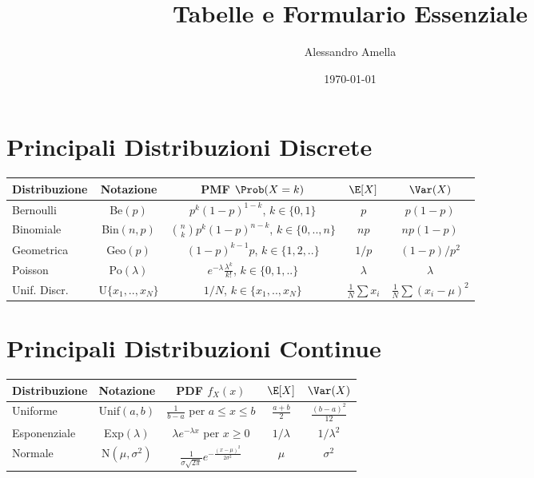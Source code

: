 

\title{Tabelle e Formulario Essenziale}
\author{Alessandro Amella}
\date{\today}



\maketitle
\tableofcontents
\newpage

\section{Principali Distribuzioni Discrete}
\begin{tabular}{|l|c|c|c|c|}
\hline
Distribuzione & Notazione & PMF $\Prob(X=k)$ & $\E[X]$ & $\Var(X)$ \\ \hline
Bernoulli & Be$(p)$ & $p^k(1-p)^{1-k}$, $k \in \{0,1\}$ & $p$ & $p(1-p)$ \\ \hline
Binomiale & Bin$(n,p)$ & $\binom{n}{k}p^k(1-p)^{n-k}$, $k \in \{0,..,n\}$ & $np$ & $np(1-p)$ \\ \hline
Geometrica & Geo$(p)$ & $(1-p)^{k-1}p$, $k \in \{1,2,..\}$ & $1/p$ & $(1-p)/p^2$ \\ \hline
Poisson & Po$(\lambda)$ & $e^{-\lambda}\frac{\lambda^k}{k!}$, $k \in \{0,1,..\}$ & $\lambda$ & $\lambda$ \\ \hline
Unif. Discr. & U$\{x_1,..,x_N\}$ & $1/N$, $k \in \{x_1,..,x_N\}$ & $\frac{1}{N}\sum x_i$ & $\frac{1}{N}\sum (x_i-\mu)^2$ \\ \hline
\end{tabular}

\section{Principali Distribuzioni Continue}
\begin{tabular}{|l|c|c|c|c|}
\hline
Distribuzione & Notazione & PDF $f_X(x)$ & $\E[X]$ & $\Var(X)$ \\ \hline
Uniforme & Unif$(a,b)$ & $\frac{1}{b-a}$ per $a \le x \le b$ & $\frac{a+b}{2}$ & $\frac{(b-a)^2}{12}$ \\ \hline
Esponenziale & Exp$(\lambda)$ & $\lambda e^{-\lambda x}$ per $x \ge 0$ & $1/\lambda$ & $1/\lambda^2$ \\ \hline
Normale & N$(\mu, \sigma^2)$ & $\frac{1}{\sigma\sqrt{2\pi}}e^{-\frac{(x-\mu)^2}{2\sigma^2}}$ & $\mu$ & $\sigma^2$ \\ \hline
\end{tabular}

